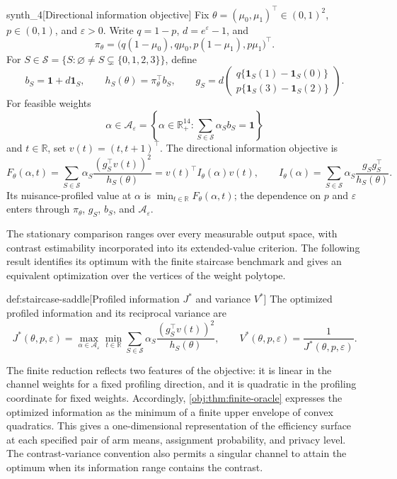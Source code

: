 \documentclass[11pt]{article}
\begin{document}
\begin{definitionv}{synth_4}[Directional information objective]
Fix \(\theta=(\mu_0,\mu_1)^\top\in(0,1)^2\), \(p\in(0,1)\), and \(\varepsilon>0\). Write \(q=1-p\), \(d=e^\varepsilon-1\), and
\[
\pi_\theta=\bigl(q(1-\mu_0),q\mu_0,p(1-\mu_1),p\mu_1\bigr)^\top.
\]
For \(S\in\mathcal S=\{S:\varnothing\ne S\subsetneq\{0,1,2,3\}\}\), define
\[
b_S=\mathbf1+d\mathbf1_S,\qquad
h_S(\theta)=\pi_\theta^\top b_S,\qquad
g_S=d\begin{pmatrix}
q\{\mathbf1_S(1)-\mathbf1_S(0)\}\\
p\{\mathbf1_S(3)-\mathbf1_S(2)\}
\end{pmatrix}.
\]
For feasible weights
\[
\alpha\in\mathcal A_\varepsilon
=\left\{\alpha\in\mathbb R_+^{14}:
\sum_{S\in\mathcal S}\alpha_S b_S=\mathbf1\right\}
\]
and \(t\in\mathbb R\), set \(v(t)=(t,t+1)^\top\). The directional information objective is
\[
F_\theta(\alpha,t)
=\sum_{S\in\mathcal S}\alpha_S
\frac{(g_S^\top v(t))^2}{h_S(\theta)}
=v(t)^\top I_\theta(\alpha)v(t),
\qquad
I_\theta(\alpha)=
\sum_{S\in\mathcal S}\alpha_S\frac{g_Sg_S^\top}{h_S(\theta)}.
\]
Its nuisance-profiled value at \(\alpha\) is \(\min_{t\in\mathbb R}F_\theta(\alpha,t)\); the dependence on \(p\) and \(\varepsilon\) enters through \(\pi_\theta\), \(g_S\), \(b_S\), and \(\mathcal A_\varepsilon\).
\end{definitionv}

The stationary comparison ranges over every measurable output space, with contrast estimability incorporated into its extended-value criterion. The following result identifies its optimum with the finite staircase benchmark and gives an equivalent optimization over the vertices of the weight polytope.

\begin{definitionv}{def:staircase-saddle}[Profiled information $J^*$ and variance $V^*$]
The optimized profiled information and its reciprocal variance are
\[
J^*(\theta,p,\varepsilon)
=
\max_{\alpha\in\mathcal A_\varepsilon}
\min_{t\in\mathbb R}
\sum_{S\in\mathcal S}
\alpha_S\frac{(g_S^{\top}v(t))^2}{h_S(\theta)},
\qquad
V^*(\theta,p,\varepsilon)
=
\frac{1}{J^*(\theta,p,\varepsilon)}.
\]
\end{definitionv}

The finite reduction reflects two features of the objective: it is linear in the channel weights for a fixed profiling direction, and it is quadratic in the profiling coordinate for fixed weights. Accordingly, \cref{obj:thm:finite-oracle} expresses the optimized information as the minimum of a finite upper envelope of convex quadratics. This gives a one-dimensional representation of the efficiency surface at each specified pair of arm means, assignment probability, and privacy level. The contrast-variance convention also permits a singular channel to attain the optimum when its information range contains the contrast.
\end{document}
